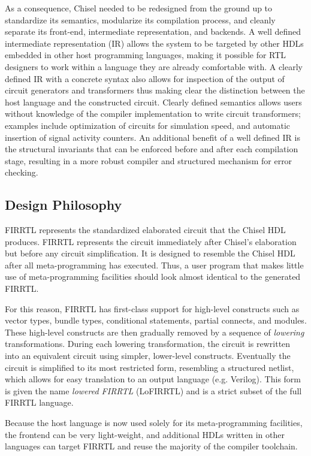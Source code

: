 \documentclass[12pt]{article}
\begin{document}
As a consequence, Chisel needed to be redesigned from the ground up to standardize its semantics, modularize its compilation process, and cleanly separate its front-end, intermediate representation, and backends. A well defined intermediate representation (IR) allows the system to be targeted by other HDLs embedded in other host programming languages, making it possible for RTL designers to work within a language they are already comfortable with. A clearly defined IR with a concrete syntax also allows for inspection of the output of circuit generators and transformers thus making clear the distinction between the host language and the constructed circuit. Clearly defined semantics allows users without knowledge of the compiler implementation to write circuit transformers; examples include optimization of circuits for simulation speed, and automatic insertion of signal activity counters. An additional benefit of a well defined IR is the structural invariants that can be enforced before and after each compilation stage, resulting in a more robust compiler and structured mechanism for error checking.

\subsection{Design Philosophy}
FIRRTL represents the standardized elaborated circuit that the Chisel HDL produces. FIRRTL represents the circuit immediately after Chisel's elaboration but before any circuit simplification. It is designed to resemble the Chisel HDL after all meta-programming has executed. Thus, a user program that makes little use of meta-programming facilities should look almost identical to the generated FIRRTL.

For this reason, FIRRTL has first-class support for high-level constructs such as vector types, bundle types, conditional statements, partial connects, and modules. These high-level constructs are then gradually removed by a sequence of {\em lowering} transformations. During each lowering transformation, the circuit is rewritten into an equivalent circuit using simpler, lower-level constructs. Eventually the circuit is simplified to its most restricted form, resembling a structured netlist, which allows for easy translation to an output language (e.g. Verilog). This form is given the name {\em lowered FIRRTL} (LoFIRRTL) and is a strict subset of the full FIRRTL language.

Because the host language is now used solely for its meta-programming facilities, the frontend can be very light-weight, and additional HDLs written in other languages can target FIRRTL and reuse the majority of the compiler toolchain.
\end{document}
